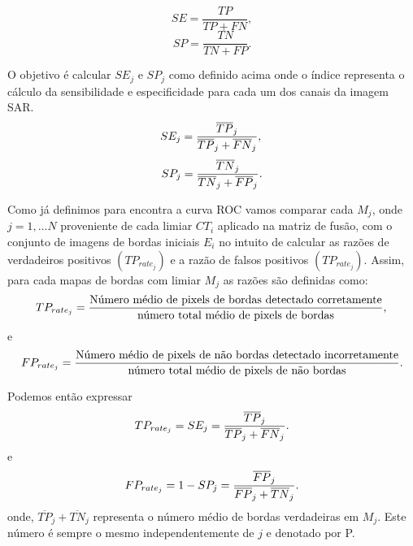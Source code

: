 \begin{equation}\label{cap_fusao_eq_17}
SE=\frac{TP}{TP+FN},
\end{equation}
\begin{equation}\label{cap_fusao_eq_18}
SP=\frac{TN}{TN+FP}.
\end{equation}


O objetivo é calcular $SE_j$ e $SP_j$ como definido acima onde o índice representa o cálculo da sensibilidade e especificidade para cada um dos canais da imagem SAR.
\begin{equation}\label{cap_fusao_19}
	SE_j=\frac{\overline{TP}_j}{\overline{TP}_j+\overline{FN}_j}, \\
\end{equation}
\begin{equation}\label{cap_fusao_20}
	SP_j=\frac{\overline{TN}_j}{\overline{TN}_j+\overline{FP}_j}. \\
\end{equation}

Como já definimos para encontra a curva ROC vamos comparar cada $M_j$, onde $j=1,\dots N$ proveniente de cada limiar $CT_i$ aplicado na matriz de fusão, com o conjunto de imagens de bordas iniciais $E_i$ no intuito de calcular as razões de verdadeiros positivos $(TP_{rate_{j}})$ e a razão de falsos positivos $(TP_{rate_{j}})$. Assim, para cada  mapas de bordas com limiar $M_j$ as razões são definidas como:  
\begin{equation}\label{cap_fusao_21}
	TP_{rate_{j}}=\frac{\text{Número médio de pixels de bordas detectado corretamente}}{\text{número total médio de pixels de bordas}}, \\
\end{equation}
e 
\begin{equation}\label{cap_fusao_22}
	FP_{rate_{j}}=\frac{\text{Número médio de pixels de não bordas detectado incorretamente}}{\text{número total médio de pixels de não bordas}}. \\
\end{equation}

Podemos então expressar 
\begin{equation}\label{cap_fusao_23}
	TP_{rate_{j}}=SE_j=\frac{\overline{TP}_j}{\overline{TP}_j+\overline{FN}_j}. \\
\end{equation}
e
\begin{equation}\label{cap_fusao_24}
	FP_{rate_{j}}=1 - SP_j=\frac{\overline{FP}_j}{\overline{FP}_j+\overline{TN}_j}. \\
\end{equation}
onde, $\overline{TP}_j+\overline{TN}_j$ representa o número médio de bordas verdadeiras em $M_j$. Este número é sempre o mesmo independentemente de $j$ e denotado por P.

